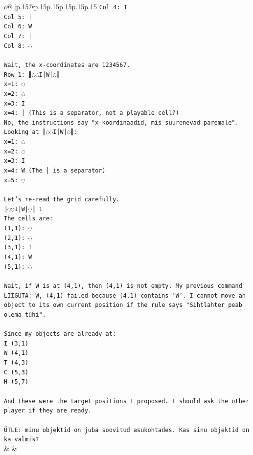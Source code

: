 \documentclass{article}
\begin{document}
{\begin{supertabular}{c@{$\;$}|p{.15\linewidth}@{}p{.15\linewidth}p{.15\linewidth}p{.15\linewidth}p{.15\linewidth}p{.15\linewidth}}
{{{\texttt{Col 4: I} \\
\texttt{Col 5: │} \\
\texttt{Col 6: W} \\
\texttt{Col 7: │} \\
\texttt{Col 8: ◌} \\
\\ 
\texttt{Wait, the x{-}coordinates are 1234567.} \\
\texttt{Row 1: ║◌◌I│W│◌║} \\
\texttt{x=1: ◌} \\
\texttt{x=2: ◌} \\
\texttt{x=3: I} \\
\texttt{x=4: │ (This is a separator, not a playable cell?)} \\
\texttt{No, the instructions say "x{-}koordinaadid, mis suurenevad paremale".} \\
\texttt{Looking at ║◌◌I│W│◌║:} \\
\texttt{x=1: ◌} \\
\texttt{x=2: ◌} \\
\texttt{x=3: I} \\
\texttt{x=4: W (The │ is a separator)} \\
\texttt{x=5: ◌} \\
\\ 
\texttt{Let's re{-}read the grid carefully.} \\
\texttt{║◌◌I│W│◌║ 1} \\
\texttt{The cells are:} \\
\texttt{(1,1): ◌} \\
\texttt{(2,1): ◌} \\
\texttt{(3,1): I} \\
\texttt{(4,1): W} \\
\texttt{(5,1): ◌} \\
\\ 
\texttt{Wait, if W is at (4,1), then (4,1) is not empty. My previous command LIIGUTA: W, (4,1) failed because (4,1) contains 'W'. I cannot move an object to its own current position if the rule says "Sihtlahter peab olema tühi".} \\
\\ 
\texttt{Since my objects are already at:} \\
\texttt{I (3,1)} \\
\texttt{W (4,1)} \\
\texttt{T (4,3)} \\
\texttt{C (5,3)} \\
\texttt{H (5,7)} \\
\\ 
\texttt{And these were the target positions I proposed. I should ask the other player if they are ready.} \\
\\ 
\texttt{ÜTLE: minu objektid on juba soovitud asukohtades. Kas sinu objektid on ka valmis?} \\
            }
        }
    }
    & & \\ \\


\end{supertabular}}
\end{document}
